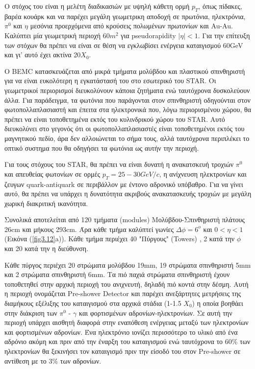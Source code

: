 	
	Ο στόχος του είναι η μελέτη διαδικασιών με υψηλή κάθετη ορμή $p_T$, όπως πίδακες, βαρέα κουάρκ και να παρέχει μεγάλη γεωμετρικη αποδοχή σε πρωτόνια, ηλεκτρόνια, $\pi^0$ και $\eta$ μεσόνια προερχόμενα από κρούσεις πολωμένων πρωτονίων και Au-Au. 
	Καλύπτει μία γεωμετρική περιοχή $60m^2$ για pseudorapidity $|\eta|<1$.
	Για την επίτευξη των στόχων θα πρέπει να είναι σε θέση να εγκλωβίσει ενέργεια καταιγισμού 60GeV και γι' αυτό έχει ακτίνα 20$X_0$.
	
	Ο BEMC κατασκευάζεται από μικρά τμήματα μολύβδου και πλαστικού σπινθηριστή για να είναι ευκολότερη η εγκατάστασή του στο εσωτερικό του STAR. Οι γεωμετρικοί περιορισμοί διευκολύνουν κάποια ζητήματα ενώ ταυτόχρονα δυσκολεύουν άλλα. Για παράδειγμα, τα φωτόνια που παράγονται στον σπινθηριστή οδηγούνται στον φωτοπολλαπλασιαστή και έπειτα στα ηλεκτρονικά που, λόγω περιορισμένου χώρου, θα πρέπει να είναι τοποθετημένα εκτός του κυλινδρικού χώρου του STAR. Αυτό διευκολύνει στο γεγονός ότι  οι φωτοπολλαπλασιαστές είναι τοποθετημένοι εκτός του μαγνητικού πεδίο, άρα δεν αλλοιώνεται το σήμα τους, αλλά ταυτόχρονα περιπλέκει το οπτικό συστημα που θα οδηγήσει τα φωτόνια ως αυτήν την περιοχή.
	
	Για τους στόχους του STAR, θα πρέπει να είναι δυνατή η ανακατσκευή τροχιών $\pi^0$ και απευθείας φωτονίων σε ορμές $p_T=25-30GeV/c$, η ανίχνευση ηλεκτρονίων και ζευγων quark-antiquark σε περιβάλλον με έντονο αδρονικό υπόβαθρο. Για να γίνει αυτό, θα πρέπει να υπάρχει η δυνατότητα ακριβούς ανακατασκευής τροχιών με μεγάλη χωρική διακριτική ικανότητα.
	
	
	Συνολικά αποτελείται από 120 τμήματα (modules) Μολύβδου-Σπινθηριστή πλάτους 26cm και μήκους 293cm. Άρα κάθε τμήμα καλύπτεί γωνίες $\Delta \phi=6^o$ και $0<\eta<1$ (Εικόνα (\ref{fig3.12}a)). Κάθε τμήμα περιέχει 40 "Πύργους" (Towers)	, 2 κατά την $\phi$ και 20 κατά την η διεύθυνση.
	
	Κάθε πύργος περιέχει 20 στρώματα μολύβδου 19mm, 19 στρώματα σπινθηριστή 5mm και 2 στρώματα σπινθηριστή 6mm. Τα πιό παχιά στρώματα σπινθηριστή έχουν τοποθετηθεί στην αρχική περιοχή του ανιχνευτή, δηλαδή πιό κοντά στην δέσμη. Αυτή η περιοχή ονομάζεται Pre-shower Detector και παρέχει ανεξάρτητες μετρήσεις της διαμήκους εξέλιξης του καταιγισμού στα αρχικά στάδια (1-1.5 $X_0$) η οποία βοηθάει στην διάκριση των $\pi^0$ - $\gamma$ και φορτισμένων αδρονίων-ηλεκτρονίων.
	Σε αυτή την περιοχή υπάρχει αισθητή διαφορά στην εναπόθεση ενέργειας μεταξύ των ηλεκτρονίων και φορτισμένων αδρονίων. Ένα ηλεκτρόνιο ιονίζει περισσότερο το υλικό από ένα αδρόνιο ακόμη και πριν από την έναρξη του καταιγισμού ενώ ταυτόχρονα το 60\% των ηλεκτρονίων θα ξεκινήσει τον καταιγισμό πριν την είσοδό του στον Pre-shower σε αντίθεση με το 3\% των αδρονίων. 
	
